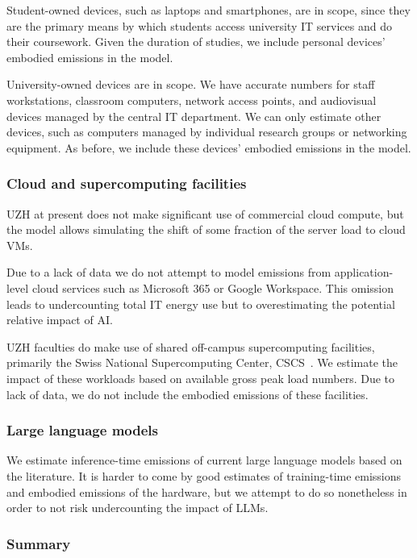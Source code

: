 \documentclass[11pt]{article}
\begin{document}
Student-owned devices, such as laptops and smartphones, are in scope, since they are the primary means by which students access university IT services and do their coursework. Given the duration of studies, we include personal devices' embodied emissions in the model.

University-owned devices are in scope. We have accurate numbers for staff workstations, classroom computers, network access points, and audiovisual devices managed by the central IT department. We can only estimate other devices, such as computers managed by individual research groups or networking equipment. As before, we include these devices' embodied emissions in the model.

\subsubsection*{Cloud and supercomputing facilities}

UZH at present does not make significant use of commercial cloud compute, but the model allows simulating the shift of some fraction of the server load to cloud VMs.

Due to a lack of data we do not attempt to model emissions from application-level cloud services such as Microsoft 365 or Google Workspace. This omission leads to undercounting total IT energy use but to overestimating the potential relative impact of AI.

UZH faculties do make use of shared off-campus supercomputing facilities, primarily the Swiss National Supercomputing Center, CSCS~\cite{cscs}. We estimate the impact of these workloads based on available gross peak load numbers. Due to lack of data, we do not include the embodied emissions of these facilities.

\subsubsection*{Large language models}

We estimate inference-time emissions of current large language models based on the literature. It is harder to come by good estimates of training-time emissions and embodied emissions of the hardware, but we attempt to do so nonetheless in order to not risk undercounting the impact of LLMs.

\subsubsection*{Summary}
\end{document}
